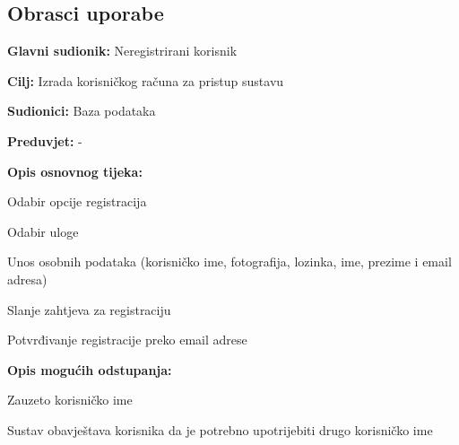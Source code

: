 			
			\eject 
			
			
				
			\subsection{Obrasci uporabe}
				
					
					\noindent {}
					\begin{packed_item}
						
						\item \textbf{Glavni sudionik: } Neregistrirani korisnik
						\item  \textbf{Cilj:} Izrada korisničkog računa za pristup sustavu
						\item  \textbf{Sudionici:} Baza podataka
						\item  \textbf{Preduvjet:} -
						\item  \textbf{Opis osnovnog tijeka:}
						
						\item[] \begin{packed_enum}
							
							\item Odabir opcije registracija
							\item Odabir uloge
							\item Unos osobnih podataka (korisničko ime, fotografija, lozinka, ime, prezime i email adresa)
							\item Slanje zahtjeva za registraciju
							\item Potvrđivanje registracije preko email adrese
							
						
								\end{packed_enum}
								
						\item  \textbf{Opis mogućih odstupanja:}
						
						\item[] \begin{packed_item}
							
							\item[3.a] Zauzeto korisničko ime
							\begin{packed_enum}
								
								\item Sustav obavještava korisnika da je potrebno upotrijebiti drugo korisničko ime
								
								\end{packed_enum}
							

\end{packed_item}
\end{packed_item}
